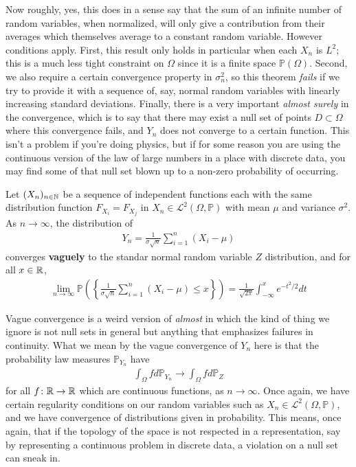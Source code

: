 \documentclass[11pt]{article}
\begin{document}
Now roughly, yes, this does in a sense say that the sum of an infinite number of random variables, when normalized, will only give a contribution from their averages which themselves average to a constant random variable. However conditions apply. First, this result only holds in particular when each $X_n$ is $L^2$; this is a much less tight constraint on $\Omega$ since it is a finite space $\mathbb{P}(\Omega)$. Second, we also require a certain convergence property in $\sigma^2_n$, so this theorem \emph{fails} if we try to provide it with a sequence of, say, normal random variables with linearly increasing standard deviations. Finally, there is a very important \emph{almost surely} in the convergence, which is to say that there may exist a null set of points $D \subset \Omega$ where this convergence fails, and $Y_n$ does not converge to a certain function. This isn't a problem if you're doing physics, but if for some reason you are using the continuous version of the law of large numbers in a place with discrete data, you may find some of that null set blown up to a non-zero probability of occurring.

\begin{theorem}
Let $(X_n)_{n\in \mathbb{N}}$ be a sequence of independent functions each with the same distribution function $F_{X_i} = F_{X_j}$ in $X_n \in \mathcal L^2 (\Omega, \mathbb{P})$ with mean $\mu$ and variance $\sigma^2$. As $n \to \infty$, the distribution of \begin{gather*}
Y_n = \frac{1}{\sigma\sqrt n} \sum_{i=1}^n (X_i - \mu)
\end{gather*}
converges \textbf{vaguely} to the standar normal random variable $Z$ distribution, and for all $x \in \mathbb{R}$, \begin{gather*}
\lim_{n\to \infty} \mathbb{P}\left(  \left\{\frac{1}{\sigma\sqrt n} \sum_{i=1}^n (X_i - \mu) \le x \right\} \right) = \frac{1}{\sqrt{2\pi}}\int_{-\infty}^x e^{-t^2 /2} dt
\end{gather*}
\end{theorem}

Vague convergence is a weird version of \emph{almost} in which the kind of thing we ignore is not null sets in general but anything that emphasizes failures in continuity. What we mean by the vague convergence of $Y_n$ here is that the probability law measures $\mathbb{P}_{Y_n}$ have \begin{gather*}
\int_\Omega f d \mathbb{P}_{Y_n} \to \int_\Omega f d \mathbb{P}_{Z}
\end{gather*}
for all $f \colon \mathbb{R} \to \mathbb{R}$ which are continuous functions, as $n \to \infty$. Once again, we have certain regularity conditions on our random variables such as $X_n \in \mathcal L^2 (\Omega, \mathbb P)$, and we have convergence of distributions given in probability. This means, once again, that if the topology of the space is not respected in a representation, say by representing a continuous problem in discrete data, a violation on a null set can sneak in.
\end{document}
